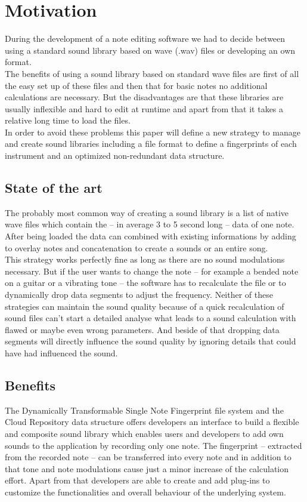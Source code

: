 \chapter{Motivation}
	During the development of a note editing software we had to decide between using a standard sound library based on wave (.wav) files or developing an own format. 
	\\The benefits of using a sound library based on standard wave files are first of all the easy set up of these files and then that for basic notes no additional calculations are necessary. But the disadvantages are that these libraries are usually inflexible and hard to edit at runtime and apart from that it takes a relative long time to load the files.
	\\In order to avoid these problems this paper will define a new strategy to manage and create sound libraries including a file format to define a fingerprints of each instrument and an optimized non-redundant data structure.
	
	\section{State of the art}
	The probably most common way of creating a sound library is a list of native wave files which contain the -- in average 3 to 5 second long -- data of one note. After being loaded the data can combined with existing informations by adding to overlay notes and concatenation to create a sounds or an entire song.
	\\This strategy works perfectly fine as long as there are no sound modulations necessary. But if the user wants to change the note -- for example a bended note on a guitar or a vibrating tone -- the software has to recalculate the file or to dynamically drop data segments to adjust the frequency. Neither of these strategies can maintain the sound quality because of a quick recalculation of sound files can’t start a detailed analyse what leads to a sound calculation with flawed or maybe even wrong parameters. And beside of that dropping data segments will directly influence the sound quality by ignoring details that could have had influenced the sound.
			
	\section{Benefits}
	The Dynamically Transformable Single Note Fingerprint file system and the Cloud Repository data structure offers developers an interface to build a flexible and composite sound library which enables users and developers to add own sounds to the application by recording only one note. The fingerprint -- extracted from the recorded note -- can be transferred into every note and in addition to that tone and note modulations cause just a minor increase of the calculation effort. Apart from that developers are able to create and add plug-ins to customize the functionalities and overall behaviour of the underlying system.
	